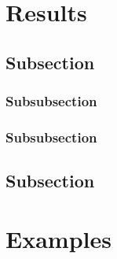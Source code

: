 \documentclass[a4paper, 11pt]{lt_article}
\begin{document}
\blindtext


\section{Results} %

\subsection{Subsection} %

\Blindtext[1]

\subsubsection{Subsubsection}
\Blindtext[2]

\subsubsection{Subsubsection}
\Blindtext[1]

\subsection{Subsection} %

\Blindtext[2]



\newrefcontext[sorting=nyt]
\printbibliography

\newpage
\section{Examples} %
\label{sec:Examples}

\textrm{\blindtext}

\textit{\blindtext}
\end{document}
